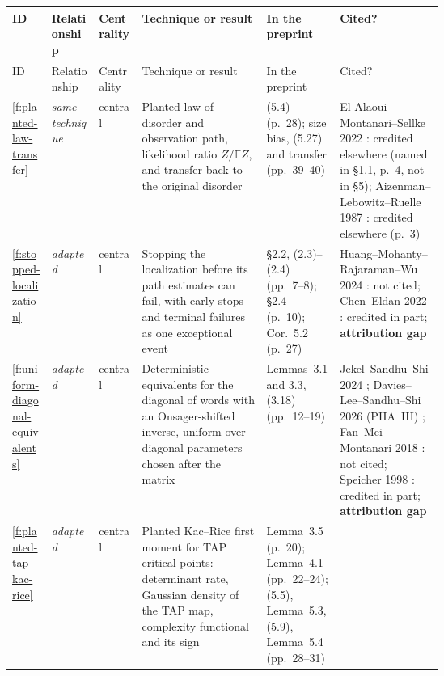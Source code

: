 \documentclass[11pt]{article}
\newcommand{\E}{\mathbb{E}}
\newcommand{\rel}[1]{\textit{#1}}
\newcommand{\attrgap}{\textbf{attribution gap}}
\begin{document}
\begin{center}\footnotesize
\begin{xltabular}{\linewidth}{@{}l >{\raggedright\arraybackslash}p{0.11\linewidth} >{\raggedright\arraybackslash}p{0.10\linewidth} >{\raggedright\arraybackslash}X >{\raggedright\arraybackslash}p{0.17\linewidth} >{\raggedright\arraybackslash}p{0.24\linewidth}@{}}
\toprule
ID & Relationship & Centrality & Technique or result & In the preprint & Cited?\\
\midrule
\endfirsthead
\toprule
ID & Relationship & Centrality & Technique or result & In the preprint & Cited?\\
\midrule
\endhead
\ref{f:planted-law-transfer} & \rel{same technique} & central &
Planted law of disorder and observation path, likelihood ratio $Z/\E Z$, and transfer back to the original disorder &
(5.4) (p.~28); size bias, (5.27) and transfer (pp.~39--40) &
El Alaoui--Montanari--Sellke 2022 \cite{ElAlaouiMontanariSellke2022-SamplingSKAlgorithmicSL}: credited elsewhere (named in \S1.1, p.~4, not in \S5); Aizenman--Lebowitz--Ruelle 1987 \cite{NL-AizenmanLebowitzRuelle1987}: credited elsewhere (p.~3)\\
\addlinespace
\ref{f:stopped-localization} & \rel{adapted} & central &
Stopping the localization before its path estimates can fail, with early stops and terminal failures as one exceptional event &
\S2.2, (2.3)--(2.4) (pp.~7--8); \S2.4 (p.~10); Cor.~5.2 (p.~27) &
Huang--Mohanty--Rajaraman--Wu 2024 \cite{HuangEtAl2024-WeakPoincareSimulatedAnnealing}: not cited; Chen--Eldan 2022 \cite{ChenEldan2022-LocalizationSchemes}: credited in part; \attrgap\\
\addlinespace
\ref{f:uniform-diagonal-equivalents} & \rel{adapted} & central &
Deterministic equivalents for the diagonal of words with an Onsager-shifted inverse, uniform over diagonal parameters chosen after the matrix &
Lemmas~3.1 and 3.3, (3.18) (pp.~12--19) &
Jekel--Sandhu--Shi 2024 \cite{JekelSandhuShi2024-PotentialHessianAscentSK}; Davies--Lee--Sandhu--Shi 2026 (PHA~III) \cite{DaviesEtAl2026-PotentialHessianAscentIIISampling}; Fan--Mei--Montanari 2018 \cite{FanMeiMontanari2018-TAPFreeEnergyVariationalInference}: not cited; Speicher 1998 \cite{Speicher1998-OperatorValuedFreeProbability}: credited in part; \attrgap\\
\addlinespace
\ref{f:planted-tap-kac-rice} & \rel{adapted} & central &
Planted Kac--Rice first moment for TAP critical points: determinant rate, Gaussian density of the TAP map, complexity functional and its sign &
Lemma~3.5 (p.~20); Lemma~4.1 (pp.~22--24); (5.5), Lemma~5.3, (5.9), Lemma~5.4 (pp.~28--31) &

\end{xltabular}
\end{center}
\end{document}
